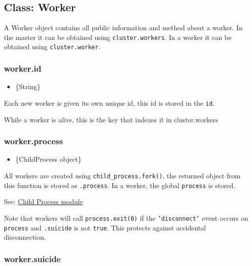 \subsection{Class: Worker}\label{class-worker}

A Worker object contains all public information and method about a
worker. In the master it can be obtained using \texttt{cluster.workers}.
In a worker it can be obtained using \texttt{cluster.worker}.

\subsubsection{worker.id}\label{worker.id}

\begin{itemize}
\itemsep1pt\parskip0pt
\item
  \{String\}
\end{itemize}

Each new worker is given its own unique id, this id is stored in the
\texttt{id}.

While a worker is alive, this is the key that indexes it in
cluster.workers

\subsubsection{worker.process}\label{worker.process}

\begin{itemize}
\itemsep1pt\parskip0pt
\item
  \{ChildProcess object\}
\end{itemize}

All workers are created using \texttt{child\_process.fork()}, the
returned object from this function is stored as \texttt{.process}. In a
worker, the global \texttt{process} is stored.

See:
\href{child_process.html\#child_process_child_process_fork_modulepath_args_options}{Child
Process module}

Note that workers will call \texttt{process.exit(0)} if the
\texttt{'disconnect'} event occurs on \texttt{process} and
\texttt{.suicide} is not \texttt{true}. This protects against accidental
disconnection.

\subsubsection{worker.suicide}\label{worker.suicide}

